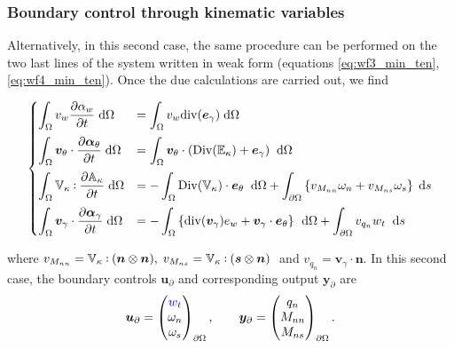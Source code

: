 \documentclass[preprint,12pt]{elsarticle}
\newcommand{\RevOne}[1]{\textcolor{blue!80!black}{#1}}
\def\onedot{$\mathsurround0pt\ldotp$}
\def\cddot{%
	\mathbin{\vcenter{\baselineskip.67ex
			\hbox{\onedot}\hbox{\onedot}}%
}}
\begin{document}
\subsubsection{Boundary control through kinematic variables}
Alternatively, in this second case, the same procedure can be performed on the two last lines of the system written in weak form (equations \eqref{eq:wf3_min_ten}, \eqref{eq:wf4_min_ten}). Once the due calculations are carried out, we find

\begin{equation}
\label{eq:WF_Min_Kin}
\begin{cases}
\displaystyle\int_{\Omega} v_w \diffp{\alpha_w}{t}  \d\Omega  &= \displaystyle \int_{\Omega} v_w \mathrm{div}(\bm{e}_{\gamma})  \d\Omega \vspace{2mm}\\
\displaystyle\int_{\Omega} \bm{v}_{\theta} \cdot \diffp{\bm\alpha_{\theta}}{t}   \d\Omega &= \displaystyle \int_{\Omega} \bm{v}_{\theta} \cdot (\mathrm{Div}(\mathbb{E}_{\kappa}) + \bm{e}_{\gamma}) \;  \d\Omega \vspace{2mm} \\
\displaystyle\int_{\Omega} \mathbb{V}_{\kappa} \cddot \diffp{\mathbb{A}_{\kappa}}{t}   \d\Omega &= - \displaystyle\int_{\Omega} \mathrm{Div}(\mathbb{V}_{\kappa}) \cdot \bm{e}_\theta \;  \d\Omega +  \displaystyle\int_{\partial \Omega} \left\{ v_{M_{nn}} \omega_{n} + v_{M_{ns}} \omega_{s} \right\}  \d{s} \vspace{2mm} \\
\displaystyle\int_{\Omega} \bm{v}_{\gamma} \cdot \diffp{\bm\alpha_{\gamma}}{t}   \d\Omega &=  - \displaystyle\int_{\Omega} \left\{ \mathrm{div}(\bm{v}_{\gamma}) e_w + \bm{v}_{\gamma} \cdot \bm{e}_{\theta} \right\} \, \d\Omega + \displaystyle\int_{\partial \Omega} v_{q_{n}} w_t \;  \d{s}
\end{cases}
\end{equation}

where $v_{M_{nn}} = \mathbb{V}_{\kappa} \cddot (\bm{n} \otimes \bm{n}), \;  v_{M_{ns}} = \mathbb{V}_{\kappa} \cddot (\bm{s} \otimes \bm{n}) \;$ and $v_{q_n} = \bm{v}_{\gamma} \cdot \bm{n}$.
In this second case,  the boundary controls $\bm{u}_\partial$ and corresponding output $\bm{y}_\partial$ are
\[\bm{u}_\partial = 
\begin{pmatrix}
\RevOne{w_t} \\
\omega_{n} \\
\omega_{s} \\
\end{pmatrix}_{\partial \Omega}, \qquad
\bm{y}_\partial = 
\begin{pmatrix}
q_n \\
M_{nn} \\
M_{ns} \\
\end{pmatrix}_{\partial \Omega}.
\]
\end{document}
